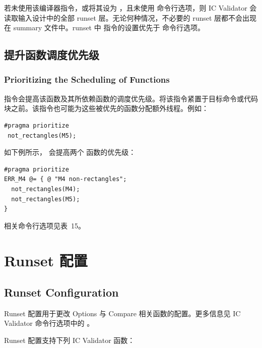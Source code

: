 若未使用该编译器指令，或将其设为 ，且未使用  命令行选项，则 IC Validator 会读取输入设计中的全部 runset 层。无论何种情况，不必要的 runset 层都不会出现在 summary 文件中。runset 中  指令的设置优先于  命令行选项。

\subsection{提升函数调度优先级}
\subsubsection*{Prioritizing the Scheduling of Functions}

 指令会提高该函数及其所依赖函数的调度优先级。将该指令紧置于目标命令或代码块之前。该指令也可能为这些被优先的函数分配额外线程。例如：
\begin{lstlisting}[style=pxl]
#pragma prioritize
 not_rectangles(M5);
\end{lstlisting}

如下例所示， 会提高两个  函数的优先级：
\begin{lstlisting}[style=pxl]
#pragma prioritize
ERR_M4 @= { @ "M4 non-rectangles";
  not_rectangles(M4);
  not_rectangles(M5);
}
\end{lstlisting}

相关命令行选项见表~15。

\section{Runset 配置}
\subsection*{Runset Configuration}

Runset 配置用于更改 Options 与 Compare 相关函数的配置。更多信息见 IC Validator 命令行选项中的 。

Runset 配置支持下列 IC Validator 函数：

